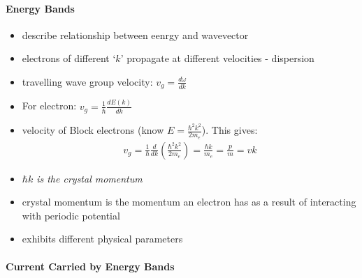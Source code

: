 \documentclass[a4paper,11pt,normalem]{article}
\begin{document}
\paragraph{Energy Bands}

\begin{itemize}
    \item describe relationship between eenrgy and wavevector
    \item electrons of different `\(k\)' propagate at different velocities - dispersion
    \item travelling wave group velocity: $v_g = \frac{d\omega}{dk}$
    \item For electron: $v_g = \frac{1}{\hbar}\frac{dE(k)}{dk}$
    \item velocity of Block electrons (know \(E = \frac{\hbar^2k^2}{2m_e}\)). This gives:
        \begin{align*}
            v_g = \frac{1}{\hbar}\frac{d}{dk}\left(\frac{\hbar^2k^2}{2m_e}\right) = \frac{\hbar k}{m_e} = \frac{p}{m} = vk
        \end{align*}
    \item \emph{\(\hbar k\) is the crystal momentum}
    \item crystal momentum is the momentum an electron has as a result of interacting with periodic potential
    \item exhibits different physical parameters
\end{itemize}

\paragraph{Current Carried by Energy Bands}
\end{document}
